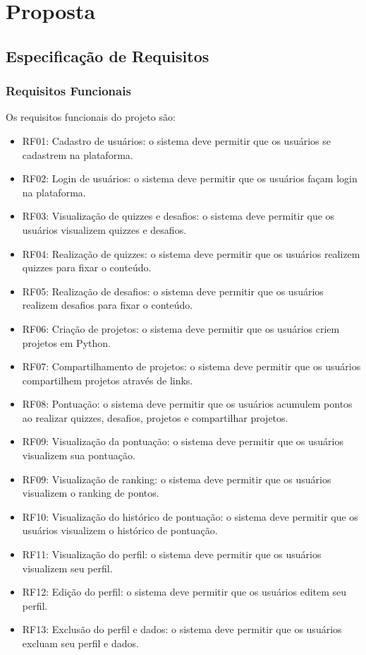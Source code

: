 \chapter{Proposta}

\section{Especificação de Requisitos}

\subsection{Requisitos Funcionais}

Os requisitos funcionais do projeto são:

\begin{itemize}
    \item RF01: Cadastro de usuários: o sistema deve permitir que os usuários se cadastrem na plataforma.
    \item RF02: Login de usuários: o sistema deve permitir que os usuários façam login na plataforma.
    \item RF03: Visualização de quizzes e desafios: o sistema deve permitir que os usuários visualizem quizzes e desafios.
    \item RF04: Realização de quizzes: o sistema deve permitir que os usuários realizem quizzes para fixar o conteúdo.
    \item RF05: Realização de desafios: o sistema deve permitir que os usuários realizem desafios para fixar o conteúdo.
    \item RF06: Criação de projetos: o sistema deve permitir que os usuários criem projetos em Python.
    \item RF07: Compartilhamento de projetos: o sistema deve permitir que os usuários compartilhem projetos através de links.
    \item RF08: Pontuação: o sistema deve permitir que os usuários acumulem pontos ao realizar quizzes, desafios, projetos e compartilhar projetos.
    \item RF09: Visualização da pontuação: o sistema deve permitir que os usuários visualizem sua pontuação.
    \item RF09: Visualização de ranking: o sistema deve permitir que os usuários visualizem o ranking de pontos.
    \item RF10: Visualização do histórico de pontuação: o sistema deve permitir que os usuários visualizem o histórico de pontuação.
    \item RF11: Visualização do perfil: o sistema deve permitir que os usuários visualizem seu perfil.
    \item RF12: Edição do perfil: o sistema deve permitir que os usuários editem seu perfil.
    \item RF13: Exclusão do perfil e dados: o sistema deve permitir que os usuários excluam seu perfil e dados.
\end{itemize}

